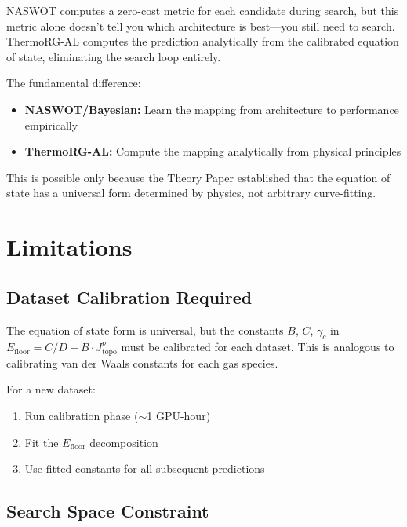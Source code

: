 \documentclass[11pt, a4paper]{article}
\theoremstyle{plain}
\begin{document}
NASWOT computes a zero-cost metric for each candidate during search, but this metric alone doesn't tell you which architecture is best---you still need to search. ThermoRG-AL computes the prediction analytically from the calibrated equation of state, eliminating the search loop entirely.

The fundamental difference:
\begin{itemize}
\item \textbf{NASWOT/Bayesian:} Learn the mapping from architecture to performance empirically
\item \textbf{ThermoRG-AL:} Compute the mapping analytically from physical principles
\end{itemize}

This is possible only because the Theory Paper established that the equation of state has a universal form determined by physics, not arbitrary curve-fitting.

\section{Limitations}

\subsection{Dataset Calibration Required}

The equation of state form is universal, but the constants $B$, $C$, $\gamma_c$ in $E_{\mathrm{floor}} = C/D + B \cdot J_{\mathrm{topo}}^{\nu}$ must be calibrated for each dataset. This is analogous to calibrating van der Waals constants for each gas species.

For a new dataset:
\begin{enumerate}
\item Run calibration phase ($\sim$1 GPU-hour)
\item Fit the $E_{\mathrm{floor}}$ decomposition
\item Use fitted constants for all subsequent predictions
\end{enumerate}

\subsection{Search Space Constraint}
\end{document}
